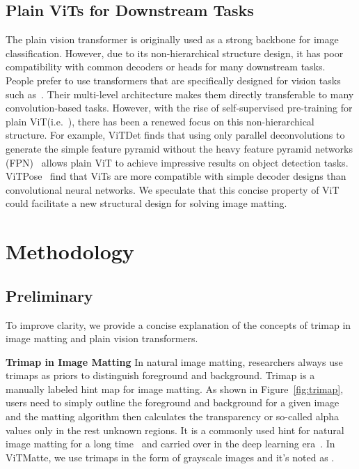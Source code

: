 \documentclass[10pt,twocolumn,letterpaper]{article}
\newcommand{\thename}{ViTMatte}
\begin{document}
\subsection{Plain ViTs for Downstream Tasks}
The plain vision transformer is originally used as a strong backbone for image classification\cite{vit}. However, due to its non-hierarchical structure design, it has poor compatibility with common decoders or heads for many downstream tasks. People prefer to use transformers that are specifically designed for vision tasks such as~\cite{swin, PVT, T2T,heo2021rethinking,fan2021multiscale}. Their multi-level architecture makes them directly transferable to many convolution-based tasks. However, with the rise of self-supervised pre-training for plain ViT(i.e.~\cite{he2022masked}), there has been a renewed focus on this non-hierarchical structure. For example, ViTDet\cite{vitdet} finds that using only parallel deconvolutions to generate the simple feature pyramid without the heavy feature pyramid networks (FPN)~\cite{fpn} allows plain ViT to achieve impressive results on object detection tasks.  ViTPose~\cite{vitpose} find that ViTs are more compatible with simple decoder designs than convolutional neural networks. We speculate that this concise property of ViT could facilitate a new structural design for solving image matting.



\section{Methodology} 

\subsection{Preliminary}
To improve clarity, we provide a concise explanation of the concepts of trimap in image matting and plain vision transformers.

\textbf{Trimap in Image Matting} 
In natural image matting, researchers always use trimaps as priors to distinguish foreground and background. Trimap is a manually labeled hint map for image matting. As shown in Figure~\ref{fig:trimap}, users need to simply outline the foreground and background for a given image and the matting algorithm then calculates the transparency or so-called alpha values only in the rest unknown regions. It is a commonly used hint for natural image matting for a long time~\cite{knn, closed-form} and carried over in the deep learning era~\cite{matteformer, rmat, transmatting}. In \thename{}, we use trimaps in the form of grayscale images and it's noted as .
\end{document}
